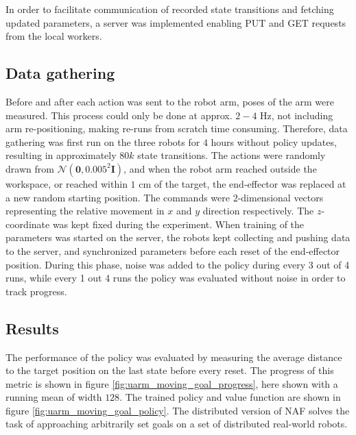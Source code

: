 In order to facilitate communication of recorded state transitions and fetching
updated parameters, a server was implemented enabling PUT and GET requests from
the local workers.

\subsection{Data gathering}

Before and after each action was sent to the robot arm, poses of the arm were
measured. This process could only be done at approx. $2-4$ Hz, not including
arm re-positioning, making re-runs from scratch time consuming. Therefore, data
gathering was first run on the three robots for $4$ hours without policy
updates, resulting in approximately $80k$ state transitions. The actions were
randomly drawn from $\mathcal{N}(\mathbf{0}, 0.005^2 \mathbf{I})$, and when the
robot arm reached outside the workspace, or reached within $1$ cm of the
target, the end-effector was replaced at a new random starting position. The
commands were 2-dimensional vectors representing the relative movement in $x$
and $y$ direction respectively. The $z$-coordinate was kept fixed during the
experiment. When training of the parameters was started on the server, the
robots kept collecting and pushing data to the server, and synchronized
parameters before each reset of the end-effector position. During this phase,
noise was added to the policy during every 3 out of 4 runs, while every 1 out 4
runs the policy was evaluated without noise in order to track progress.

\subsection{Results}

The performance of the policy was evaluated by measuring the average distance
to the target position on the last state before every reset. The progress of
this metric is shown in figure \ref{fig:uarm_moving_goal_progress}, here shown
with a running mean of width $128$. The trained policy and value function are
shown in figure \ref{fig:uarm_moving_goal_policy}. The distributed version of
NAF solves the task of approaching arbitrarily set goals on a set of
distributed real-world robots.

